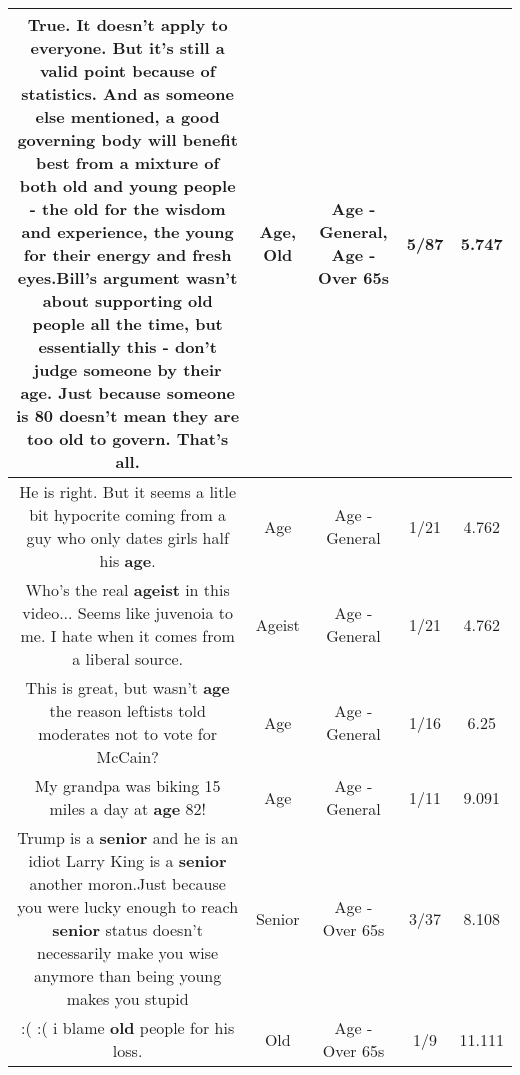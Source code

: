 \documentclass[11pt]{article}
\newlength\mylength
\begin{document}
\begin{center}
\begin{longtable}{|C{.65\mylength}|C{.30\mylength}|C{.12\mylength}|C{.12\mylength}|C{.12\mylength}|}
  \small True. It doesn't apply to everyone. But it's still a valid point because of statistics. And as someone else mentioned, a good governing body will benefit best from a mixture of both \textbf{old} and young people - the \textbf{old} for the wisdom and experience, the young for their energy and fresh eyes.Bill's argument wasn't about supporting \textbf{old} people all the time, but essentially this - don't judge someone by their \textbf{age}. Just because someone is 80 doesn't mean they are too \textbf{old} to govern. That's all.\normalsize   & Age, Old & Age - General, Age - Over 65s & 5/87 & 5.747 \\  \hline
  \small He is right. But it seems a litle bit hypocrite coming from a guy who only dates girls half his \textbf{age}.\normalsize   & Age & Age - General & 1/21 & 4.762 \\  \hline
  \small Who's the real \textbf{ageist} in this video... Seems like juvenoia to me. I hate when it comes from a liberal source.\normalsize   & Ageist & Age - General & 1/21 & 4.762 \\  \hline
  \small This is great, but wasn't \textbf{age} the reason leftists told moderates not to vote for McCain?\normalsize   & Age & Age - General & 1/16 & 6.25 \\  \hline
  \small My grandpa was biking 15 miles a day at \textbf{age} 82!\normalsize   & Age & Age - General & 1/11 & 9.091 \\  \hline
  \small Trump is a \textbf{senior} and he is an idiot Larry King  is a \textbf{senior} another moron.Just because you were lucky enough to reach \textbf{senior} status doesn't necessarily  make you wise anymore than being young makes you stupid\normalsize   & Senior & Age - Over 65s & 3/37 & 8.108 \\  \hline
  \small :(  :( i blame \textbf{old} people for his loss.\normalsize   & Old & Age - Over 65s & 1/9 & 11.111 \\  \hline

\end{longtable}
\end{center}
\end{document}
